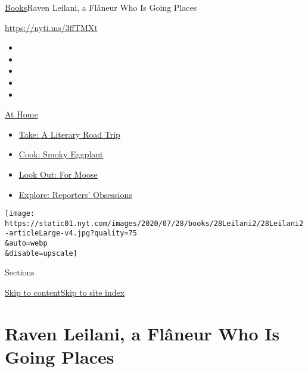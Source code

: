 \href{/section/books}{Books}\textbar{}Raven Leilani, a Flâneur Who Is
Going Places

\url{https://nyti.ms/3ffTMXt}

\begin{itemize}
\item
\item
\item
\item
\item
\end{itemize}

\href{https://www.nytimes.com/spotlight/at-home?action=click\&pgtype=Article\&state=default\&region=TOP_BANNER\&context=at_home_menu}{At
Home}

\begin{itemize}
\tightlist
\item
  \href{https://www.nytimes.com/2020/07/28/books/time-for-a-literary-road-trip.html?action=click\&pgtype=Article\&state=default\&region=TOP_BANNER\&context=at_home_menu}{Take:
  A Literary Road Trip}
\item
  \href{https://www.nytimes.com/2020/07/29/magazine/bored-with-your-home-cooking-some-smoky-eggplant-will-fix-that.html?action=click\&pgtype=Article\&state=default\&region=TOP_BANNER\&context=at_home_menu}{Cook:
  Smoky Eggplant}
\item
  \href{https://www.nytimes.com/2020/07/27/travel/moose-michigan-isle-royale.html?action=click\&pgtype=Article\&state=default\&region=TOP_BANNER\&context=at_home_menu}{Look
  Out: For Moose}
\item
  \href{https://www.nytimes.com/interactive/2020/at-home/even-more-reporters-editors-diaries-lists-recommendations.html?action=click\&pgtype=Article\&state=default\&region=TOP_BANNER\&context=at_home_menu}{Explore:
  Reporters' Obsessions}
\end{itemize}

\texttt{[image: https://static01.nyt.com/images/2020/07/28/books/28Leilani2/28Leilani2-articleLarge-v4.jpg?quality=75\\\&auto=webp\\\&disable=upscale]}

Sections

\protect\hyperlink{site-content}{Skip to
content}\protect\hyperlink{site-index}{Skip to site index}

\hypertarget{raven-leilani-a-fluxe2neur-who-is-going-places}{%
\section{Raven Leilani, a Flâneur Who Is Going
Places}\label{raven-leilani-a-fluxe2neur-who-is-going-places}}

